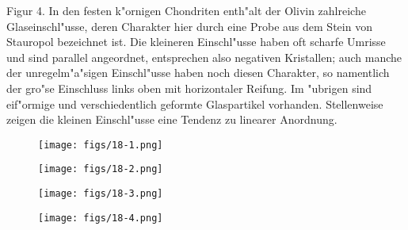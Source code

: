 \documentclass[a4paper, 11pt, oneside, polutonikogreek, german]{article}
\begin{document}
Figur 4. In den festen k"ornigen Chondriten enth"alt der Olivin zahlreiche Glaseinschl"usse, deren Charakter hier durch eine Probe aus dem Stein von Stauropol bezeichnet ist. Die kleineren Einschl"usse haben oft scharfe Umrisse und sind parallel angeordnet, entsprechen also negativen Kristallen; auch manche der unregelm"a"sigen Einschl"usse haben noch diesen Charakter, so namentlich der gro"se Einschluss links oben mit horizontaler Reifung. Im "ubrigen sind eif"ormige und verschiedentlich geformte Glaspartikel vorhanden. Stellenweise zeigen die kleinen Einschl"usse eine Tendenz zu linearer Anordnung.
\clearpage

\vspace*{\fill}
\begin{figure}[H]
\centering
\texttt{[image: figs/18-1.png]}
\caption{}
\end{figure}
\vspace*{\fill}
\clearpage

\vspace*{\fill}
\begin{figure}[H]
\centering
\texttt{[image: figs/18-2.png]}
\caption{}
\end{figure}
\vspace*{\fill}
\clearpage

\vspace*{\fill}
\begin{figure}[H]
\centering
\texttt{[image: figs/18-3.png]}
\caption{}
\end{figure}
\vspace*{\fill}
\clearpage

\vspace*{\fill}
\begin{figure}[H]
\centering
\texttt{[image: figs/18-4.png]}
\caption{}
\end{figure}
\vspace*{\fill}
\clearpage
\end{document}
